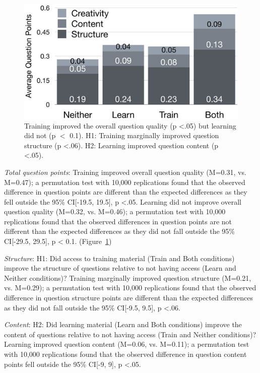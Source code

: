 \begin{figure}[h] 
  \centering
  \includegraphics[width=1.0\textwidth]{figures/docent/fig-5.png}
  \caption[Training improved the overall question quality but learning did not]
{Training improved the overall question quality (p <.05) but learning did not (p $<$ 0.1). H1: Training marginally improved question structure (p <.06). H2: Learning improved question content (p <.05).}
  \label{fig:docent-5}
\end{figure}

\textit{Total question points}: Training improved overall question quality (M=0.31, vs. M=0.47); a permutation test with 10,000 replications found that the observed difference in question points are different than the expected differences as they fell outside the 95\% CI[-19.5, 19.5], p <.05. Learning did not improve overall question quality (M=0.32, vs. M=0.46); a permutation test with 10,000 replications found that the observed differences in question points are not different than the expected differences as they did not fall outside the 95\% CI[-29.5, 29.5], p < 0.1. (Figure~\ref{fig:docent-5})

\textit{Structure}: H1: Did access to training material (Train and Both conditions) improve the structure of questions relative to not having access (Learn and Neither conditions)? Training marginally improved question structure (M=0.21, vs. M=0.29); a permutation test with 10,000 replications found that the observed difference in question structure points are different than the expected differences as they did not fall outside the 95\% CI[-9.5, 9.5], p <.06.

\textit{Content}: H2: Did learning material (Learn and Both conditions) improve the content of questions relative to not having access (Train and Neither conditions)? Learning improved question content (M=0.06, vs. M=0.11); a permutation test with 10,000 replications found that the observed difference in question content points fell outside the 95\% CI[-9, 9], p <.05.

